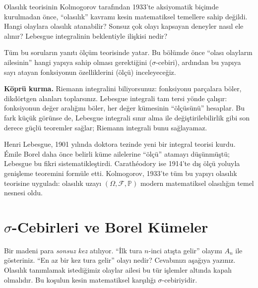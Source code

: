 \begin{motivasyon}
Olasılık teorisinin Kolmogorov tarafından 1933'te aksiyomatik biçimde
kurulmadan önce, ``olasılık'' kavramı kesin matematiksel temellere sahip
değildi. Hangi olaylara olasılık atanabilir? Sonsuz çok olayı kapsayan
deneyler nasıl ele alınır? Lebesgue integralinin beklentiyle ilişkisi nedir?

Tüm bu soruların yanıtı ölçüm teorisinde yatar. Bu bölümde önce ``olası
olayların ailesinin'' hangi yapıya sahip olması gerektiğini ($\sigma$-cebiri),
ardından bu yapıya sayı atayan fonksiyonun özelliklerini (ölçü) inceleyeceğiz.

\medskip

\textbf{Köprü kurma.} Riemann integralini biliyorsunuz: fonksiyonu parçalara böler,
dikdörtgen alanları toplarsınız. Lebesgue integrali tam tersi yönde çalışır:
fonksiyonun değer aralığını böler, her değer kümesinin ``ölçüsünü'' hesaplar.
Bu fark küçük görünse de, Lebesgue integrali sınır alma ile değiştirilebilirlik
gibi son derece güçlü teoremler sağlar; Riemann integrali bunu sağlayamaz.
\end{motivasyon}

\begin{tarihselnot}
Henri Lebesgue, 1901 yılında doktora tezinde yeni bir integral teorisi kurdu.
Émile Borel daha önce belirli küme ailelerine ``ölçü'' atamayı düşünmüştü;
Lebesgue bu fikri sistematikleştirdi. Carathéodory ise 1914'te dış ölçü
yoluyla genişleme teoremini formüle etti. Kolmogorov, 1933'te tüm bu yapıyı
olasılık teorisine uyguladı: olasılık uzayı $(\Omega, \mathcal{F}, \mathbb{P})$
modern matematiksel olasılığın temel nesnesi oldu.
\end{tarihselnot}


\section{$\sigma$-Cebirleri ve Borel Kümeler}

\begin{kesif}
Bir madeni para \emph{sonsuz kez} atılıyor. ``İlk tura $n$-inci atışta gelir''
olayını $A_n$ ile gösteriniz. ``En az bir kez tura gelir'' olayı nedir?
Cevabınızı aşağıya yazınız.
Olasılık tanımlamak istediğimiz olaylar ailesi bu tür işlemler altında kapalı
olmalıdır. Bu koşulun kesin matematiksel karşılığı $\sigma$-cebiriyidir.
\end{kesif}


